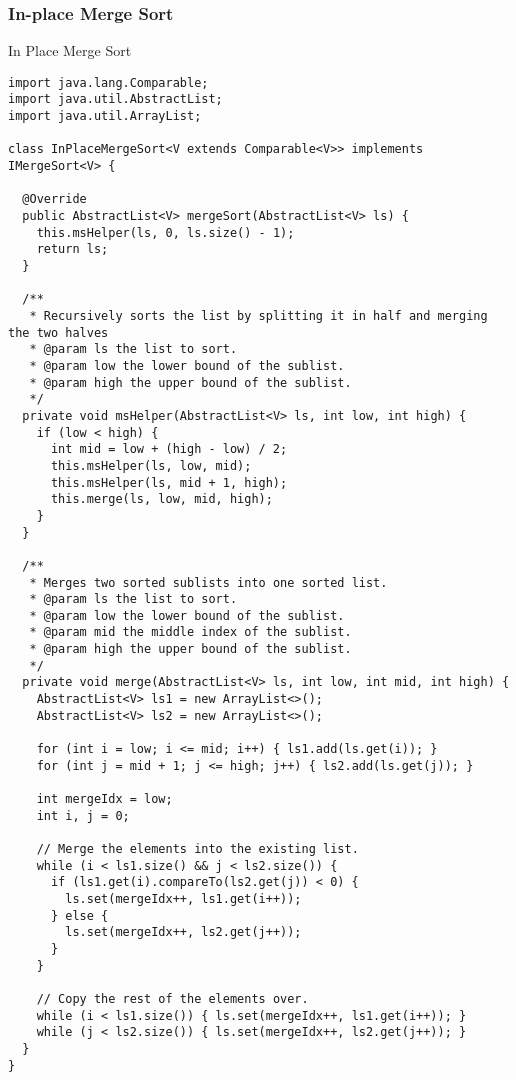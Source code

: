 \subsubsection*{In-place Merge Sort}
\begin{cl}[]{In Place Merge Sort}
\begin{lstlisting}[language=MyJava]
import java.lang.Comparable;
import java.util.AbstractList;
import java.util.ArrayList;

class InPlaceMergeSort<V extends Comparable<V>> implements IMergeSort<V> {

  @Override
  public AbstractList<V> mergeSort(AbstractList<V> ls) {
    this.msHelper(ls, 0, ls.size() - 1);
    return ls;
  }

  /**
   * Recursively sorts the list by splitting it in half and merging the two halves
   * @param ls the list to sort.
   * @param low the lower bound of the sublist. 
   * @param high the upper bound of the sublist.
   */
  private void msHelper(AbstractList<V> ls, int low, int high) {
    if (low < high) {
      int mid = low + (high - low) / 2;
      this.msHelper(ls, low, mid);
      this.msHelper(ls, mid + 1, high);
      this.merge(ls, low, mid, high);
    }
  }

  /**
   * Merges two sorted sublists into one sorted list. 
   * @param ls the list to sort.
   * @param low the lower bound of the sublist.
   * @param mid the middle index of the sublist.
   * @param high the upper bound of the sublist.
   */
  private void merge(AbstractList<V> ls, int low, int mid, int high) {
    AbstractList<V> ls1 = new ArrayList<>();
    AbstractList<V> ls2 = new ArrayList<>();

    for (int i = low; i <= mid; i++) { ls1.add(ls.get(i)); }
    for (int j = mid + 1; j <= high; j++) { ls2.add(ls.get(j)); }

    int mergeIdx = low;
    int i, j = 0;
        
    // Merge the elements into the existing list.
    while (i < ls1.size() && j < ls2.size()) {
      if (ls1.get(i).compareTo(ls2.get(j)) < 0) { 
        ls.set(mergeIdx++, ls1.get(i++)); 
      } else { 
        ls.set(mergeIdx++, ls2.get(j++)); 
      }
    }

    // Copy the rest of the elements over.
    while (i < ls1.size()) { ls.set(mergeIdx++, ls1.get(i++)); }
    while (j < ls2.size()) { ls.set(mergeIdx++, ls2.get(j++)); }
  }
}
\end{lstlisting}
\end{cl}

